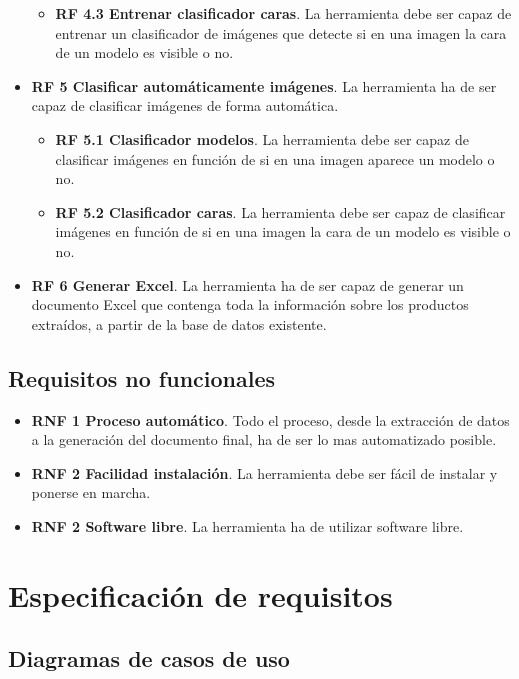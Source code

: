 \begin{itemize}
\begin{itemize}
        \item \textbf{RF 4.3 Entrenar clasificador caras}. La herramienta debe ser capaz de entrenar un clasificador de imágenes que detecte si en una imagen la cara de un modelo es visible o no.
    \end{itemize}
    \item \textbf{RF 5 Clasificar automáticamente imágenes}. La herramienta ha de ser capaz de clasificar imágenes de forma automática.
    \begin{itemize}
        \item \textbf{RF 5.1 Clasificador modelos}. La herramienta debe ser capaz de clasificar imágenes en función de si en una imagen aparece un modelo o no.
        \item \textbf{RF 5.2 Clasificador caras}. La herramienta debe ser capaz de clasificar imágenes en función de si en una imagen la cara de un modelo es visible o no.
    \end{itemize}
    \item \textbf{RF 6 Generar Excel}. La herramienta ha de ser capaz de generar un documento Excel que contenga toda la información sobre los productos extraídos, a partir de la base de datos existente. 
    
\end{itemize}

\subsection{Requisitos no funcionales}

\begin{itemize}
    \item \textbf{RNF 1 Proceso automático}. Todo el proceso, desde la extracción de datos a la generación del documento final, ha de ser lo mas automatizado posible.
    \item \textbf{RNF 2 Facilidad instalación}. La herramienta debe ser fácil de instalar y ponerse en marcha.
    \item \textbf{RNF 2 Software libre}. La herramienta ha de utilizar software libre.
\end{itemize}

\section{Especificación de requisitos}

\subsection{Diagramas de casos de  uso}

